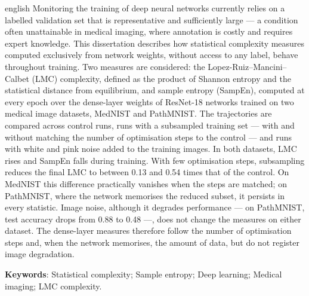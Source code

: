 \begin{resumo}[Abstract]
\begin{otherlanguage*}{english}
Monitoring the training of deep neural networks currently relies on a labelled
validation set that is representative and sufficiently large --- a condition
often unattainable in medical imaging, where annotation is costly and requires
expert knowledge. This dissertation describes how statistical complexity
measures computed exclusively from network weights, without access to any
label, behave throughout training. Two measures are considered: the
Lopez-Ruiz--Mancini--Calbet (LMC) complexity, defined as the product of Shannon
entropy and the statistical distance from equilibrium, and sample entropy
(SampEn), computed at every epoch over the dense-layer weights of
ResNet-18 networks trained on two medical image datasets, MedNIST and
PathMNIST. The trajectories are compared across control runs, runs with a
subsampled training set --- with and without matching the number of
optimisation steps to the control --- and runs with white and pink noise added
to the training images. In both datasets, LMC rises and SampEn falls during
training. With few optimisation steps, subsampling reduces the final LMC to
between 0.13 and 0.54 times that of the control. On MedNIST this difference
practically vanishes when the steps are matched; on PathMNIST, where the
network memorises the reduced subset, it persists in every statistic. Image
noise, although it degrades performance --- on PathMNIST, test accuracy drops
from 0.88 to 0.48 ---, does not change the measures on either dataset. The
dense-layer measures therefore follow the number of optimisation steps and,
when the network memorises, the amount of data, but do not register image
degradation.

\vspace{\onelineskip}
\noindent
\textbf{Keywords}: Statistical complexity; Sample entropy; Deep learning;
Medical imaging; LMC complexity.
\end{otherlanguage*}
\end{resumo}
